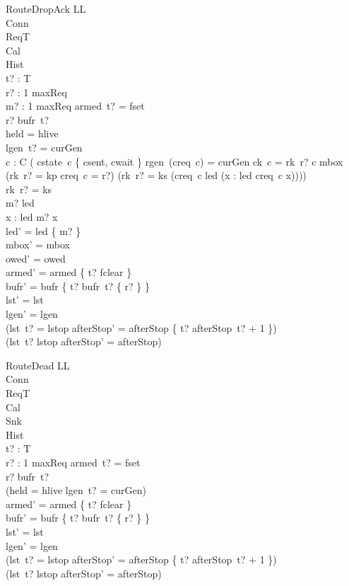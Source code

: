 \documentclass[a4paper,10pt,fleqn]{article}
\begin{document}
\begin{schema}{RouteDropAck}
  \Delta LL \\
  \Xi Conn \\
  \Xi ReqT \\
  \Xi Cal \\
  \Xi Hist \\
  t? : T \\
  r? : 1 \upto maxReq \\
  m? : 1 \upto maxReq
\where
  armed~t? = fset \\
  r? \in bufr~t? \\
  held = hlive \\
  lgen~t? = curGen \\
  \forall c : C \spot \lnot ( cstate~c \in \{ csent, cwait \}
    \land rgen~(creq~c) = curGen \land ck~c = rk~r? \land c \notin \dom mbox
    \land (rk~r? = kp \implies creq~c = r?)
    \land (rk~r? = ks \implies
      (creq~c \in led \land (\forall x : led \spot creq~c \leq x)))) \\
  rk~r? = ks \\
  m? \in led \\
  \forall x : led \spot m? \leq x \\
  led' = led \setminus \{ m? \} \\
  mbox' = mbox \\
  owed' = owed \\
  armed' = armed \oplus \{ t? \mapsto fclear \} \\
  bufr' = bufr \oplus \{ t? \mapsto bufr~t? \setminus \{ r? \} \} \\
  lst' = lst \\
  lgen' = lgen \\
  (lst~t? = lstop \implies
    afterStop' = afterStop \oplus \{ t? \mapsto afterStop~t? + 1 \}) \\
  (lst~t? \neq lstop \implies afterStop' = afterStop)
\end{schema}

\begin{schema}{RouteDead}
  \Delta LL \\
  \Xi Conn \\
  \Xi ReqT \\
  \Xi Cal \\
  \Xi Snk \\
  \Xi Hist \\
  t? : T \\
  r? : 1 \upto maxReq
\where
  armed~t? = fset \\
  r? \in bufr~t? \\
  \lnot (held = hlive \land lgen~t? = curGen) \\
  armed' = armed \oplus \{ t? \mapsto fclear \} \\
  bufr' = bufr \oplus \{ t? \mapsto bufr~t? \setminus \{ r? \} \} \\
  lst' = lst \\
  lgen' = lgen \\
  (lst~t? = lstop \implies
    afterStop' = afterStop \oplus \{ t? \mapsto afterStop~t? + 1 \}) \\
  (lst~t? \neq lstop \implies afterStop' = afterStop)
\end{schema}
\end{document}
